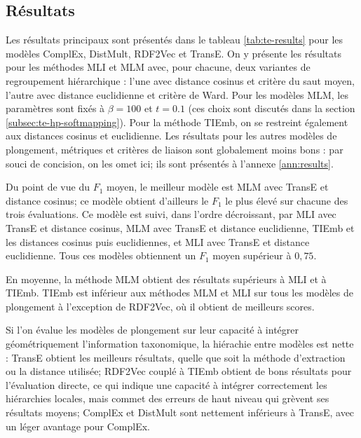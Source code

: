 \subsection{Résultats}
\label{subsec:te-results}


Les résultats principaux sont présentés dans le tableau \ref{tab:te-results} pour les modèles ComplEx, DistMult, RDF2Vec et TransE. On y présente les résultats pour les méthodes MLI et MLM avec, pour chacune, deux variantes de regroupement hiérarchique : l'une avec distance cosinus et critère du saut moyen, l'autre avec distance euclidienne et critère de Ward. Pour les modèles MLM, les paramètres sont fixés à $\beta = 100$ et $t=0.1$ (ces choix sont discutés dans la section \ref{subsec:te-hp-softmapping}). Pour la méthode TIEmb, on se restreint également aux distances cosinus et euclidienne. 
Les résultats pour les autres modèles de plongement, métriques et critères de liaison sont globalement moins bons : par souci de concision, on les omet ici; ils sont présentés à l'annexe \ref{ann:results}.

Du point de vue du $F_1$ moyen, le meilleur modèle est MLM avec TransE et distance cosinus; ce modèle obtient d'ailleurs le $F_1$ le plus élevé sur chacune des trois évaluations. Ce modèle est suivi, dans l'ordre décroissant, par MLI avec TransE et distance cosinus, MLM avec TransE et distance euclidienne, TIEmb et les distances cosinus puis euclidiennes, et MLI avec TransE et distance euclidienne. Tous ces modèles obtiennent un $F_1$ moyen supérieur à $0,75$.

En moyenne, la méthode MLM obtient des résultats supérieurs à MLI et à TIEmb. TIEmb est inférieur aux méthodes MLM et MLI sur tous les modèles de plongement à l'exception de RDF2Vec, où il obtient de meilleurs scores. 


Si l'on évalue les modèles de plongement sur leur capacité à intégrer géométriquement l'information taxonomique, la hiérachie entre modèles est nette : TransE obtient les meilleurs résultats, quelle que soit la méthode d'extraction ou la distance utilisée; RDF2Vec couplé à TIEmb obtient de bons résultats pour l'évaluation directe, ce qui indique une capacité à intégrer correctement les hiérarchies locales, mais commet des erreurs de haut niveau qui grèvent ses résultats moyens; ComplEx et DistMult sont nettement inférieurs à TransE, avec un léger avantage pour ComplEx.



